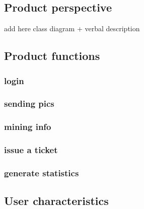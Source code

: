 



\subsection{Product perspective }


add here class diagram + verbal description





\subsection{Product functions}

\subsubsection{login }
\subsubsection{sending pics}
\subsubsection{mining info }
\subsubsection{issue a ticket }
\subsubsection{generate statistics}

\subsection{User characteristics }


